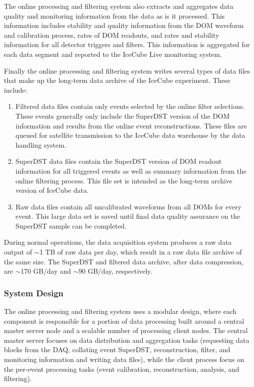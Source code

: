 The online processing and filtering system also extracts and aggregates data quality and monitoring information
from the data as is it processed.  This information includes stability and quality information from the
DOM waveform and calibration process, rates of DOM readouts, and rates and stability
information for all detector triggers and filters.  This information is aggregated for each data segment and
reported to the IceCube Live monitoring system.

Finally the online processing and filtering system writes several
types of data files that make up the long-term data archive of the IceCube
experiment.  These include:
\begin{enumerate}
\item Filtered data files contain only events selected by the online filter selections.  These events
generally only include the SuperDST version of the DOM information and results from the online event reconstructions.  These
files are queued for satellite transmission to the IceCube data warehouse by the data handling system.
\item SuperDST data files contain the SuperDST version of DOM readout information for all triggered events as well as summary
information from the online filtering process.  This file set is intended as the long-term archive version of IceCube data.
\item Raw data files contain all uncalibrated waveforms from all DOMs for every event.  This large data
set is saved until final data quality assurance on the SuperDST sample can be completed.
\end{enumerate}

During normal operations, the data acquisition system produces a raw data output of $\sim$1 TB of raw data per day, which result in
a raw data file archive of the same size.  The SuperDST and filtered data archive, after data compression, are $\sim$170 GB/day and $\sim$90 GB/day,
respectively.
\subsubsection{System Design}

The online processing and filtering system uses a modular design, where each component
is responsible for a portion of data processing built around a central master server node and a
scalable number of processing client nodes.  The central master server focuses on
data distribution and aggregation tasks (requesting data blocks from the DAQ, collating event SuperDST, reconstruction, filter,
and monitoring information and writing data files), while the client process focus on the per-event
processing tasks (event calibration, reconstruction, analysis, and filtering).  

